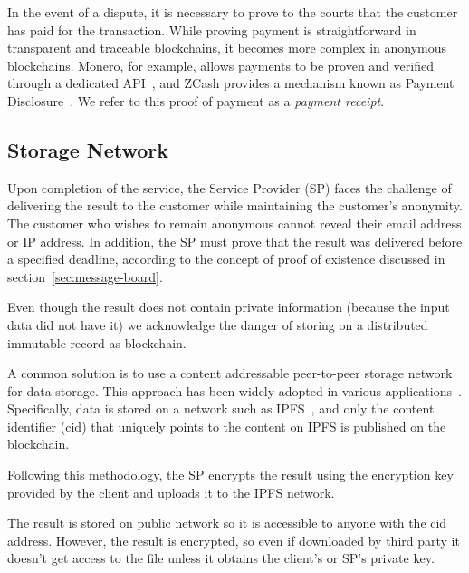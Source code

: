 \documentclass[pdftex,twocolumn,epjc3]{svjour3}
\begin{document}
\begin{sloppypar}
In the event of a dispute, it is necessary to prove to the courts that the customer has paid for the transaction. While proving payment is straightforward in transparent and traceable blockchains, it becomes more complex in anonymous blockchains. Monero, for example, allows payments to be proven and verified through a dedicated API~\cite{moneroHowProvePayment}, and ZCash provides a mechanism known as Payment Disclosure~\cite{daviesIntroductionPaymentDisclosure2017}. We refer to this proof of payment as a \textit{payment receipt}.
\end{sloppypar}

\subsection{Storage Network}\label{storage-network}

Upon completion of the service, the Service Provider (SP) faces the challenge of delivering the result to the customer while maintaining the customer's anonymity. The customer who wishes to remain anonymous cannot reveal their email address or IP address. In addition, the SP must prove that the result was delivered before a specified deadline, according to the concept of proof of existence discussed in section~\ref{sec:message-board}.

Even though the result does not contain private information (because the input data did not have it) we acknowledge the danger of storing on a distributed immutable record as blockchain.

\begin{sloppypar}
A common solution is to use a content addressable peer-to-peer storage network for data storage. This approach has been widely adopted in various applications~\cite{shahidBlockchainBasedAgriFoodSupply2020, wangAuditableProtocolsFair2019, chenImprovedP2PFile2017}. Specifically, data is stored on a network such as IPFS~\cite{benetIPFSContentAddressed2014}, and only the content identifier ($\mathrm{cid}$) that uniquely points to the content on IPFS is published on the blockchain.
\end{sloppypar}

Following this methodology, the SP encrypts the result using the encryption key provided by the client and uploads it to the IPFS network. 

The result is stored on public network so it is accessible to anyone with the cid address. However, the result is encrypted, so even if downloaded by third party it doesn't get access to the file unless it obtains the client's or SP's private key. 
\end{document}

